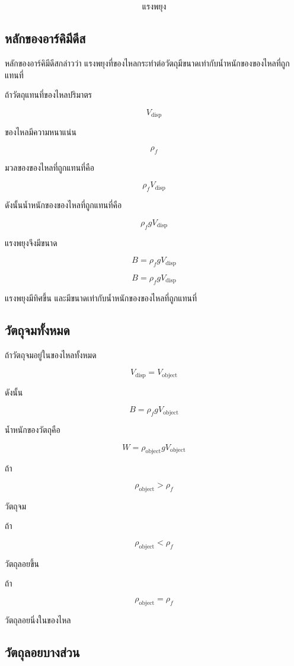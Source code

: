 \[
\text{แรงพยุง}
\]

\subsection{หลักของอาร์คิมีดีส}

หลักของอาร์คิมีดีสกล่าวว่า แรงพยุงที่ของไหลกระทำต่อวัตถุมีขนาดเท่ากับน้ำหนักของของไหลที่ถูกแทนที่

ถ้าวัตถุแทนที่ของไหลปริมาตร

\[
V_{\text{disp}}
\]

ของไหลมีความหนาแน่น

\[
\rho_f
\]

มวลของของไหลที่ถูกแทนที่คือ

\[
\rho_f V_{\text{disp}}
\]

ดังนั้นน้ำหนักของของไหลที่ถูกแทนที่คือ

\[
\rho_f g V_{\text{disp}}
\]

แรงพยุงจึงมีขนาด

\[
B=\rho_f gV_{\text{disp}}
\]

\begin{tcolorbox}[title=หลักของอาร์คิมีดีส]
\[
B=\rho_f gV_{\text{disp}}
\]

แรงพยุงมีทิศขึ้น และมีขนาดเท่ากับน้ำหนักของของไหลที่ถูกแทนที่
\end{tcolorbox}

\subsection{วัตถุจมทั้งหมด}

ถ้าวัตถุจมอยู่ในของไหลทั้งหมด

\[
V_{\text{disp}}=V_{\text{object}}
\]

ดังนั้น

\[
B=\rho_f gV_{\text{object}}
\]

น้ำหนักของวัตถุคือ

\[
W=\rho_{\text{object}}gV_{\text{object}}
\]

ถ้า

\[
\rho_{\text{object}}>\rho_f
\]

วัตถุจม

ถ้า

\[
\rho_{\text{object}}<\rho_f
\]

วัตถุลอยขึ้น

ถ้า

\[
\rho_{\text{object}}=\rho_f
\]

วัตถุลอยนิ่งในของไหล

\subsection{วัตถุลอยบางส่วน}

